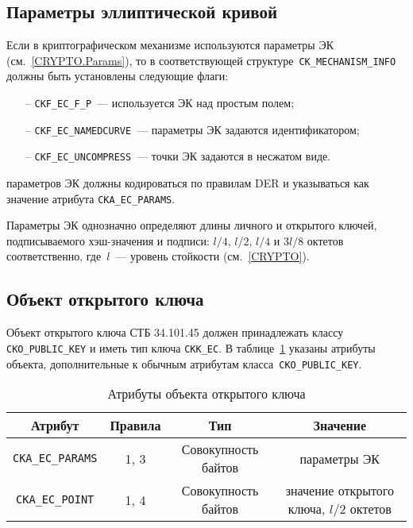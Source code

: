 \subsection{Параметры эллиптической кривой}

Если в криптографическом механизме используются параметры ЭК 
(см.~\ref{CRYPTO.Params}), то в соответствующей 
структуре~\verb|CK_MECHANISM_INFO| должны быть установлены 
следующие флаги: 
\begin{itemize}
\item[--]
\verb|CKF_EC_F_P|~--- используется ЭК над простым полем;
\item[--]
\verb|CKF_EC_NAMEDCURVE|~--- параметры ЭК задаются идентификатором;
\item[--]
\verb|CKF_EC_UNCOMPRESS|~--- точки ЭК задаются в несжатом виде.
\end{itemize}

 параметров ЭК должны кодироваться по правилам  
DER и указываться как значение атрибута \verb|CKA_EC_PARAMS|.

Параметры ЭК однозначно определяют длины личного и открытого ключей, 
подписываемого хэш-значения и подписи: $l/4$, $l/2$, $l/4$ и $3l/8$ 
октетов соответственно, где~$l$~--- уровень стойкости (см.~\ref{CRYPTO}). 

\subsection{Объект открытого ключа}


Объект открытого ключа СТБ 34.101.45 должен принадлежать
классу \verb|CKO_PUBLIC_KEY| и иметь тип ключа \verb|CKK_EC|.
%
В таблице~\ref{Table.CRYPTOKI.EcPubkeyAttrs} указаны
атрибуты объекта, дополнительные к обычным атрибутам 
класса~\verb|CKO_PUBLIC_KEY|.

\begin{table}[H]
\caption{Атрибуты объекта открытого ключа}\label{Table.CRYPTOKI.EcPubkeyAttrs}
\begin{tabular}{|c|c|c|c|}
\hline
Атрибут & Правила & Тип & Значение\\
\hline
\hline
\verb|CKA_EC_PARAMS| & 1, 3 & Совокупность байтов &
параметры ЭК\\
\hline
\verb|CKA_EC_POINT| & 1, 4 & Совокупность байтов &
значение открытого ключа, $l/2$ октетов\\
\hline
\end{tabular}
\end{table}

